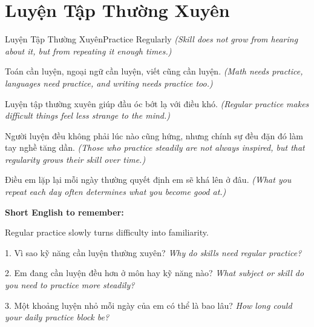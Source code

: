 \section{Luyện Tập Thường Xuyên}
\begin{truyen}{Luyện Tập Thường Xuyên}{Practice Regularly}
\textit{(Skill does not grow from hearing about it, but from repeating it enough times.)}

Toán cần luyện, ngoại ngữ cần luyện, viết cũng cần luyện.
\textit{(Math needs practice, languages need practice, and writing needs practice too.)}

Luyện tập thường xuyên giúp đầu óc bớt lạ với điều khó.
\textit{(Regular practice makes difficult things feel less strange to the mind.)}

Người luyện đều không phải lúc nào cũng hứng, nhưng chính sự đều đặn đó làm tay nghề tăng dần.
\textit{(Those who practice steadily are not always inspired, but that regularity grows their skill over time.)}
\end{truyen}

\begin{baihoc}
Điều em lặp lại mỗi ngày thường quyết định em sẽ khá lên ở đâu.
\textit{(What you repeat each day often determines what you become good at.)}
\end{baihoc}

\begin{ghinhoanh}
\textbf{Short English to remember:}

Regular practice slowly turns difficulty into familiarity.

\end{ghinhoanh}

\begin{tuhocnhanh}
1. Vì sao kỹ năng cần luyện thường xuyên? \textit{Why do skills need regular practice?}

2. Em đang cần luyện đều hơn ở môn hay kỹ năng nào? \textit{What subject or skill do you need to practice more steadily?}

3. Một khoảng luyện nhỏ mỗi ngày của em có thể là bao lâu? \textit{How long could your daily practice block be?}
\end{tuhocnhanh}
\ngancach


